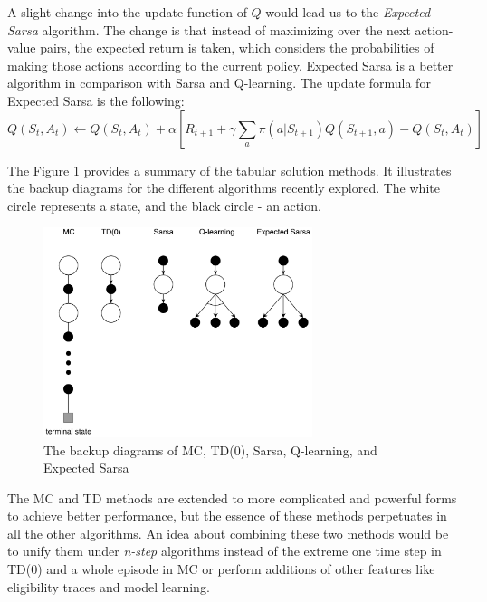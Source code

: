 A slight change into the update function of $Q$ would lead us to the \textit{Expected Sarsa} algorithm. The change is that instead of maximizing over the next action-value pairs, the expected return is taken, which considers the probabilities of making those actions according to the current policy. Expected Sarsa is a better algorithm in comparison with Sarsa and Q-learning. The update formula for Expected Sarsa is the following:
\begin{equation}\label{ESarsa}
Q(S_{t}, A_{t})\leftarrow Q(S_{t}, A_{t})+\alpha \left [ R_{t+1}+ \gamma \sum_{a}\pi(a|S_{t+1}) Q(S_{t+1}, a)-Q(S_{t}, A_{t}) \right ]
\end{equation}

The Figure \ref{fig:BackupDiagrams} provides a summary of the tabular solution methods. It illustrates the backup diagrams for the different algorithms recently explored. The white circle represents a state, and the black circle - an action.
\begin{figure}[H]
	\centering
	\includegraphics[width=0.7\textwidth]{Figures/BackupDiagrams}
	\caption{The backup diagrams of MC, TD(0), Sarsa, Q-learning, and Expected Sarsa}
	\label{fig:BackupDiagrams}
\end{figure}

The MC and TD methods are extended to more complicated and powerful forms to achieve better performance, but the essence of these methods perpetuates in all the other algorithms. An idea about combining these two methods would be to unify them under \textit{n-step} algorithms instead of the extreme one time step in TD(0) and a whole episode in MC or perform additions of other features like eligibility traces and model learning.
	

